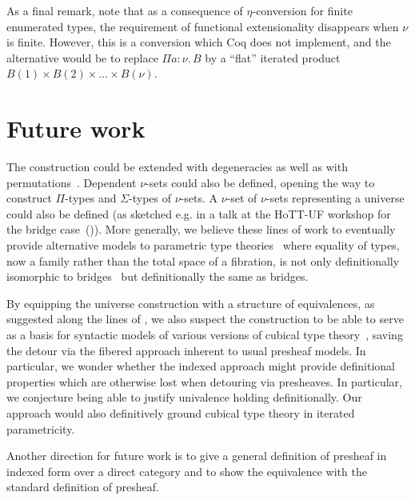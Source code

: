\documentclass{msc}
\begin{document}
As a final remark, note that as a consequence of $\eta$-conversion for finite enumerated types, the requirement of functional extensionality disappears when $\nu$ is finite. However, this is a conversion which Coq does not implement, and the alternative would be to replace $\Pi a: \nu.\, B$ by a ``flat'' iterated product $B(1) \times B(2) \times \ldots \times B(\nu)$.

\section{Future work}
The construction could be extended with degeneracies as well as with permutations~\citep{grandis03}. Dependent $\nu$-sets could also be defined, opening the way to construct $\Pi$-types and $\Sigma$-types of $\nu$-sets. A $\nu$-set of $\nu$-sets representing a universe could also be defined (as sketched e.g. in a talk at the HoTT-UF workshop for the bridge case~(\citeyear{herbelin-hott-uf})). More generally, we believe these lines of work to eventually provide alternative models to parametric type theories~\citep{nuyts17,cavallo19} where equality of types, now a family rather than the total space of a fibration, is not only definitionally isomorphic to bridges~\cite{bernardy15} but definitionally the same as bridges.

By equipping the universe construction with a structure of equivalences, as suggested along the lines of \cite{altenkirch15}, we also suspect the construction to be able to serve as a basis for syntactic models of various versions of cubical type theory~\citep{bezem13,cohen16,angiuli21}, saving the detour via the fibered approach inherent to usual presheaf models. In particular, we wonder whether the indexed approach might provide definitional properties which are otherwise lost when detouring via presheaves. In particular, we conjecture being able to justify univalence holding definitionally. Our approach would also definitively ground cubical type theory in iterated parametricity.

Another direction for future work is to give a general definition of presheaf in indexed form over a direct category and to show the equivalence with the standard definition of presheaf.

\newpage


\end{document}
